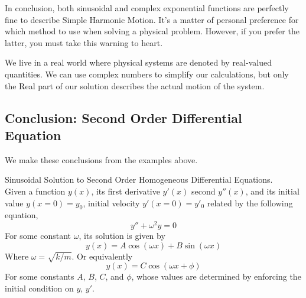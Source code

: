 \documentclass[11pt]{article}
\theoremstyle{gangnamstyle}{\newtheorem{definition}{Definition}[]}
\theoremstyle{gangnamstyle}{\newtheorem{example}{Example}[]}
\theoremstyle{gangnamstyle}{\newtheorem{problem}{Problem}[]}
\theoremstyle{gangnamstyle}{\newtheorem{warning}{Warning}[]}
\begin{document}
In conclusion, both sinusoidal and complex exponential functions are perfectly fine to describe Simple Harmonic Motion. It's a matter of personal preference for which method to use when solving a physical problem. However, if you prefer the latter, you must take this warning to heart. 

\begin{warning}
We live in a real world where physical systems are denoted by real-valued quantities. We can use complex numbers to simplify our calculations, but only the Real part of our solution describes the actual motion of the system. 
\end{warning}

\subsection{Conclusion: Second Order Differential Equation}

We make these conclusions from the examples above. 
\begin{definition}
Sinusoidal Solution to Second Order Homogeneous Differential Equations. \\
Given a function $y(x)$, its first derivative $y'(x)$ second $y''(x)$, and its initial value $y(x = 0) = y_0$, initial velocity $y'(x = 0) = y'_0$ related by the following equation, 
\begin{equation}
y'' + \omega^2y = 0
\end{equation}
For some constant $\omega$, its solution is given by
\begin{equation}
y(x) = A\cos(\omega x) + B\sin(\omega x)
\end{equation}
Where $\omega = \sqrt{k / m}$. Or equivalently
\begin{equation}
y(x) = C\cos(\omega x + \phi)
\end{equation}
For some constants $A$, $B$, $C$, and $\phi$, whose values are determined by enforcing the initial condition on $y$, $y'$. 
\end{definition}
\end{document}
